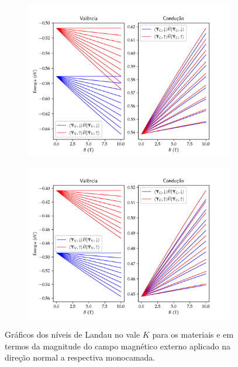 \begin{figure}[p]
  \centering
  \begin{subfigure}{\textwidth}
    \includegraphics[trim=0 0.28cm 0 0.9cm,clip,width=\textwidth]{imagens/crs2_k_valley_landau_levels.png}
    \caption{}
    \label{fig:crs2_k_valley_landau_levels}
  \end{subfigure}
  \begin{subfigure}{\textwidth}
    \includegraphics[trim=0 0.28cm 0 0.9cm,clip,width=\textwidth]{imagens/crse2_k_valley_landau_levels.png}
    \caption{}
    \label{fig:crse2_k_valley_landau_levels}
  \end{subfigure}
  \caption{
    Gráficos dos níveis de Landau no vale $K$ para os materiais
      e
      em termos da magnitude
    do campo magnético externo aplicado na direção normal a respectiva
    monocamada.
  }
  \label{fig:k_valley_landau_levels}
\end{figure}

